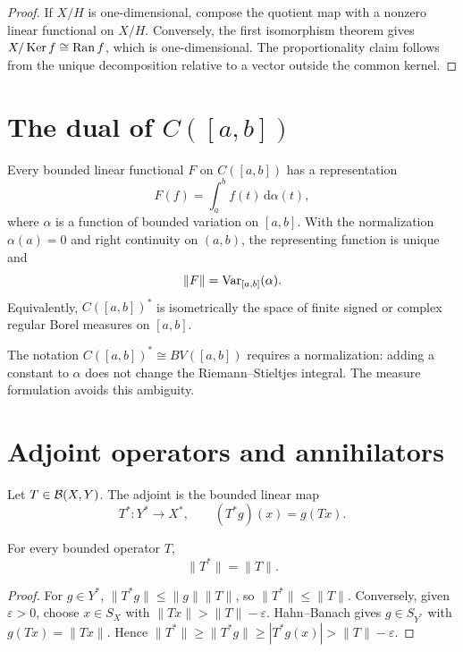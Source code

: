 \begin{proof}
If $X/H$ is one-dimensional, compose the quotient map with a nonzero linear
functional on $X/H$.  Conversely, the first isomorphism theorem gives
$X/\operatorname{Ker} f\cong\operatorname{Ran} f$, which is one-dimensional.  The proportionality claim
follows from the unique decomposition relative to a vector outside the common
kernel.
\end{proof}

\section{The dual of $C([a,b])$}

\begin{notetheorem}
Every bounded linear functional $F$ on $C([a,b])$ has a representation
\[
  F(f)=\int_a^b f(t)\,\mathrm{d}\alpha(t),
\]
where $\alpha$ is a function of bounded variation on $[a,b]$.  With the
normalization $\alpha(a)=0$ and right continuity on $(a,b)$, the representing
function is unique and
\[
  \|F\|=\operatorname{Var}_{[a,b]}(\alpha).
\]
Equivalently, $C([a,b])^*$ is isometrically the space of finite signed or
complex regular Borel measures on $[a,b]$.
\end{notetheorem}

\begin{noteremark}
The notation $C([a,b])^*\cong BV([a,b])$ requires a normalization: adding a
constant to $\alpha$ does not change the Riemann--Stieltjes integral.  The
measure formulation avoids this ambiguity.
\end{noteremark}

\section{Adjoint operators and annihilators}

\begin{notedefinition}[Adjoint]
Let $T\in\mathcal{B}(X,Y)$.  The adjoint is the bounded linear map
\[
  T^*\colon Y^*\to X^*,
  \qquad
  (T^*g)(x)=g(Tx).
\]
\end{notedefinition}

\begin{notetheorem}
For every bounded operator $T$,
\[
  \|T^*\|=\|T\|.
\]
\end{notetheorem}

\begin{proof}
For $g\in Y^*$,
$\|T^*g\|\le\|g\|\|T\|$, so $\|T^*\|\le\|T\|$.  Conversely, given
$\varepsilon>0$, choose $x\in S_X$ with
$\|Tx\|>\|T\|-\varepsilon$.  Hahn--Banach gives $g\in S_{Y^*}$ with
$g(Tx)=\|Tx\|$.  Hence
$\|T^*\|\ge\|T^*g\|\ge|T^*g(x)|>\|T\|-\varepsilon$.
\end{proof}

